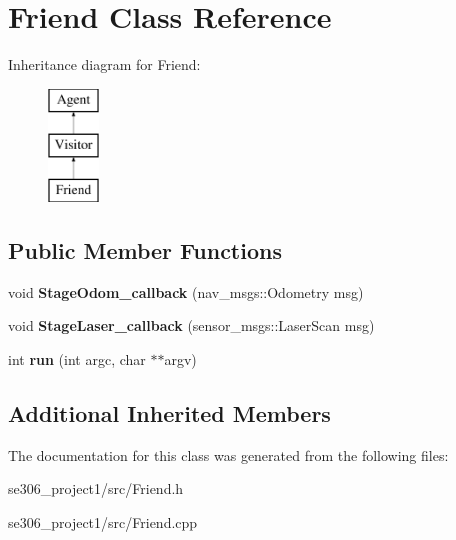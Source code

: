 \hypertarget{classFriend}{\section{Friend Class Reference}
\label{classFriend}
}
Inheritance diagram for Friend\-:\begin{figure}[H]
\begin{center}
\leavevmode
\includegraphics[height=3.000000cm]{classFriend}
\end{center}
\end{figure}
\subsection*{Public Member Functions}
\begin{DoxyCompactItemize}
\item 
\hypertarget{classFriend_ab336b2a40bc6b9787bd0e9283f29f468}{void {\bfseries Stage\-Odom\-\_\-callback} (nav\-\_\-msgs\-::\-Odometry msg)}\label{classFriend_ab336b2a40bc6b9787bd0e9283f29f468}

\item 
\hypertarget{classFriend_a1334996a432a7d435d40169bad684dc4}{void {\bfseries Stage\-Laser\-\_\-callback} (sensor\-\_\-msgs\-::\-Laser\-Scan msg)}\label{classFriend_a1334996a432a7d435d40169bad684dc4}

\item 
\hypertarget{classFriend_a110ea1d189a41d95fe2991e4e02f9c34}{int {\bfseries run} (int argc, char $\ast$$\ast$argv)}\label{classFriend_a110ea1d189a41d95fe2991e4e02f9c34}

\end{DoxyCompactItemize}
\subsection*{Additional Inherited Members}


The documentation for this class was generated from the following files\-:\begin{DoxyCompactItemize}
\item 
se306\-\_\-project1/src/Friend.\-h\item 
se306\-\_\-project1/src/Friend.\-cpp\end{DoxyCompactItemize}
